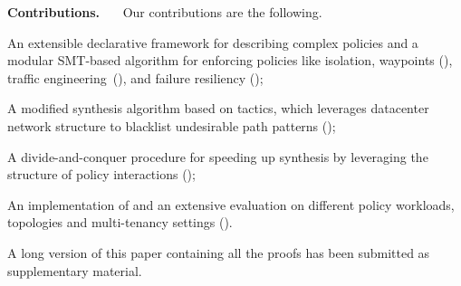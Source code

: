 \noindent \textbf{Contributions.} \ \ \ Our contributions are the following.
\begin{compactitemize}
\item An extensible declarative framework for describing
  complex policies and a modular SMT-based algorithm for enforcing policies
  like isolation, waypoints (), traffic engineering~(), and 
  failure resiliency ();
\item A modified synthesis algorithm based on tactics, which leverages datacenter network structure
  to blacklist undesirable path patterns ();
\item A divide-and-conquer procedure for speeding up synthesis by leveraging the 
structure of policy interactions ();
\item An implementation of \Name and an extensive evaluation on different policy workloads, topologies and multi-tenancy settings ().
\end{compactitemize}

\iffull\else
A long version
of this paper containing all the proofs has been submitted as supplementary material.
\fi
